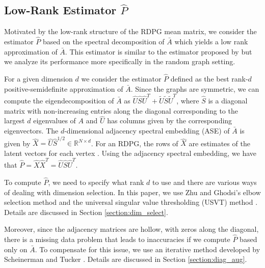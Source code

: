 \documentclass[a4paper]{article}
\begin{document}
\subsection{Low-Rank Estimator $\hat{P}$}

Motivated by the low-rank structure of the RDPG mean matrix, we consider the estimator $\hat{P}$ based on the spectral decomposition of $\bar{A}$ which yields a low rank approximation of $\bar{A}$.
This estimator is similar to the estimator proposed by \citet{chatterjee2015matrix} but we analyze its performance more specifically in the random graph setting.

For a given dimension $d$ we consider the estimator $\hat{P}$ defined as the best rank-$d$ positive-semidefinite approximation of $\bar{A}$.
Since the graphs are symmetric, we can compute the eigendecomposition of $\bar{A}$ as $\hat{U} \hat{S} \hat{U}^T + \tilde{U}\tilde{S}\tilde{U}^T$, where $\hat{S}$ is a diagonal matrix with non-increasing entries along the diagonal corresponding to the largest $d$ eigenvalues of $A$ and $\hat{U}$ has columns given by the corresponding eigenvectors.
The $d$-dimensional adjacency spectral embedding (ASE) of $\bar{A}$ is given by $\hat{X}=\hat{U} \hat{S}^{1/2}\in \mathbb{R}^{N \times d}$.
For an RDPG, the rows of $\hat{X}$ are estimates of the latent vectors for each vertex \citep{sussman2014consistent}.
Using the adjacency spectral embedding, we have that $\hat{P} = \hat{X} \hat{X}^T=\hat{U}\hat{S}\hat{U}^T$.

To compute $\hat{P}$, we need to specify what rank $d$ to use and there are various ways of dealing with dimension selection. 
In this paper, we use Zhu and Ghodsi's elbow selection method \cite{zhu2006automatic} and the universal singular value thresholding (USVT) method \cite{chatterjee2015matrix}. 
Details are discussed in Section \ref{section:dim_select}.

Moreover, since the adjacency matrices are hollow, with zeros along the diagonal, there is a missing data problem that leads to inaccuracies if we compute $\hat{P}$ based only on $\bar{A}$. 
To compensate for this issue, we use an iterative method developed by Scheinerman and Tucker \cite{scheinerman2010modeling}. 
Details are discussed in Section \ref{section:diag_aug}.
\end{document}
